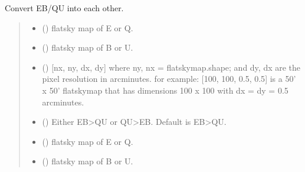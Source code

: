 \documentclass[letterpaper,10pt,english]{sphinxmanual}
\begin{document}

\begin{fulllineitems}
\label{\detokenize{flatsky:flatsky.convert_eb_qu}}
\pysigstartsignatures
{}
\pysigstopsignatures
\sphinxAtStartPar
Convert EB/QU into each other.
\begin{quote}\begin{description}
\begin{itemize}
\item {} 
\sphinxAtStartPar
{} () \textendash{} flatsky map of E or Q.

\item {} 
\sphinxAtStartPar
{} () \textendash{} flatsky map of B or U.

\item {} 
\sphinxAtStartPar
{} () \textendash{} {[}nx, ny, dx, dy{]} where ny, nx = flatskymap.shape; and dy, dx are the pixel resolution in arcminutes.
for example: {[}100, 100, 0.5, 0.5{]} is a 50’ x 50’ flatskymap that has dimensions 100 x 100 with dx = dy = 0.5 arcminutes.

\item {} 
\sphinxAtStartPar
{} () \textendash{} Either EB\textendash{}\textgreater{}QU or QU\textendash{}\textgreater{}EB.
Default is EB\textendash{}\textgreater{}QU.

\end{itemize}

\sphinxAtStartPar
\begin{itemize}
\item {} 
\sphinxAtStartPar
{} () \textendash{} flatsky map of E or Q.

\item {} 
\sphinxAtStartPar
{} () \textendash{} flatsky map of B or U.

\end{itemize}


\end{description}\end{quote}

\end{fulllineitems}
\end{document}
